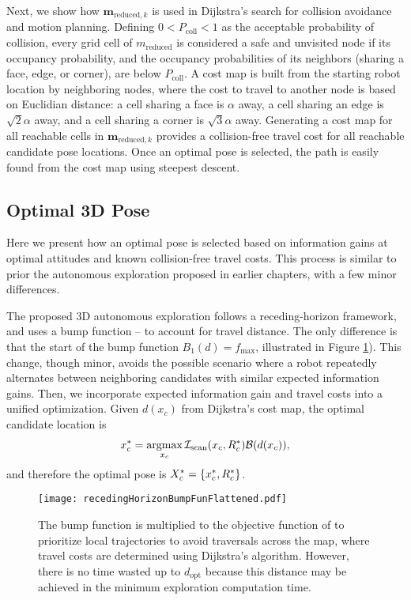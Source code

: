 Next, we show how $\mathbf{m}_{\text{reduced},k}$ is used in Dijkstra's search for collision avoidance and motion planning. Defining $0<P_\text{coll}<1$ as the acceptable probability of collision, every grid cell of $ m_\text{reduced}$ is considered a safe and unvisited node if its occupancy probability, and the occupancy probabilities of its neighbors (sharing a face, edge, or corner), are below $P_\text{coll}$. A cost map is built from the starting robot location by neighboring nodes, where the cost to travel to another node is based on Euclidian distance: a cell sharing a face is $\alpha$ away, a cell sharing an edge is $\sqrt2\alpha$ away, and a cell sharing a corner is $\sqrt3\alpha$ away. Generating a cost map for all reachable cells in $\mathbf{m}_{\text{reduced},k}$ provides a collision-free travel cost for all reachable candidate pose locations. Once an optimal pose is selected, the path is easily found from the cost map using steepest descent.


\subsection{Optimal 3D Pose}

Here we present how an optimal pose is selected based on information gains at optimal attitudes and known collision-free travel costs. This process is similar to prior the autonomous exploration proposed in earlier chapters, with a few minor differences.

The proposed 3D autonomous exploration follows a receding-horizon framework, and uses a bump function -- to account for travel distance. The only difference is that the start of the bump function $B_1(d)=f_\text{max}$, illustrated in Figure \ref{fig:recedingHorizonBumpFun}). This change, though minor, avoids the possible scenario where a robot repeatedly alternates between neighboring candidates with similar expected information gains.
Then, we incorporate expected information gain and travel costs into a unified optimization. Given $d(x_c)$ from Dijkstra's cost map, the optimal candidate location is
\begin{align}
\label{eqn:CandidateLocationOptimization}
x_c^*=\argmax_{x_c}\mathcal{I}_\text{scan}(x_c,R_c^*)\mathcal B(d(x_c)),
\end{align}
and therefore the optimal pose is $X_c^*=\left\{ x_c^*,R_c^* \right\}$.

	\begin{figure}
	\vspace*{-0.3\columnwidth}
		\centerline{
			\texttt{[image: recedingHorizonBumpFunFlattened.pdf]}
		}
	\vspace*{-0.25\columnwidth}
		\caption{The bump function is multiplied to the objective function of  to prioritize local trajectories to avoid traversals across the map, where travel costs are determined using Dijkstra's algorithm. However, there is no time wasted up to $d_\text{opt}$ because this distance may be achieved in the minimum exploration computation time.}
		\label{fig:recedingHorizonBumpFun}
	\end{figure}
	
